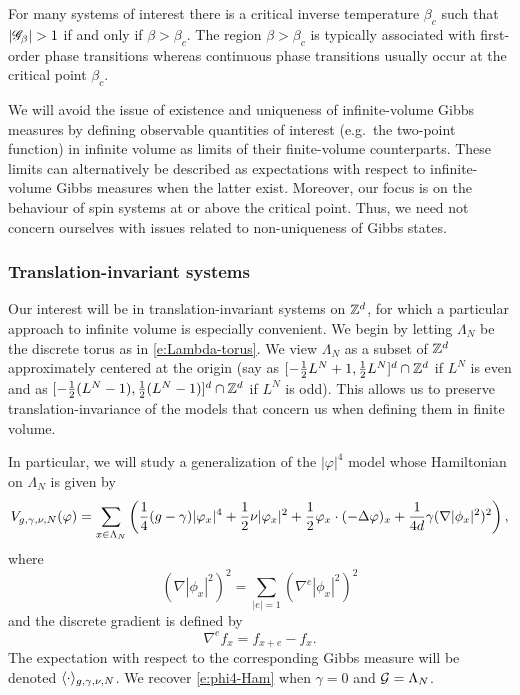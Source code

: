 For many systems of interest there is a critical inverse temperature $\beta_c$ such that
$|\mathscr{G}_\beta| > 1$ if and only if $\beta > \beta_c$. The region $\beta > \beta_c$ is typically
associated with first-order phase transitions whereas continuous phase transitions usually occur
at the critical point $\beta_c$.

We will avoid the issue of existence and uniqueness of infinite-volume Gibbs
measures
by defining observable quantities of interest (e.g.\ the two-point function) in infinite
volume as limits of their finite-volume counterparts. These limits can alternatively be
described as expectations with respect to infinite-volume Gibbs measures when the latter
exist. Moreover, our focus is on the behaviour of spin systems at or above the critical
point. Thus, we need not concern ourselves with issues related to non-uniqueness of Gibbs
states.

\subsubsection{Translation-invariant systems}

Our interest will be in translation-invariant systems on ${ {{\mathbb Z}}^d }$, for which a particular
approach to infinite volume is especially convenient. We begin by letting $\Lambda_N$
be the discrete torus as in \eqref{e:Lambda-torus}. We view $\Lambda_N$
as a subset of ${ {{\mathbb Z}}^d }$ approximately centered at the origin (say as
$[-\frac12 L^N+1,\frac12 L^N]^d \cap {\mathbb Z}^d$ if $L^N$ is even
and as $[-\frac12 (L^N-1), \frac12 (L^N-1)]^d \cap {\mathbb Z}^d$ if $L^N$ is odd). This allows us to preserve
translation-invariance of the models that concern us when defining them in finite volume.

In particular, we will study a generalization of the $|\varphi|^4$ model whose Hamiltonian
on $\Lambda_N$ is given by
\begin{equation}
\label{e:Vdef1}
V_{g,\gamma,\nu,N}(\varphi)
	=
\sum_{x\in\Lambda_N}
\left(
	\frac{1}{4} (g - \gamma) |\varphi_x|^4
		+
	\frac{1}{2} \nu |\varphi_x|^2
		+
	\frac{1}{2} \varphi_x \cdot (-\Delta \varphi)_x
		+
	\frac{1}{4 d} \gamma (\nabla |\phi_x|^2)^2
\right),
\end{equation}
where
\begin{equation}
(\nabla |\phi_x|^2)^2
	=
\sum_{|e|=1} (\nabla^e |\phi_x|^2)^2
\end{equation}
and the discrete gradient is defined by
\begin{equation}
\nabla^e f_x = f_{x+e} - f_x.
\end{equation}
The expectation with respect to the corresponding Gibbs measure will
be denoted $\langle\cdot\rangle_{g,\gamma,\nu,N}$.
We recover \eqref{e:phi4-Ham} when $\gamma = 0$ and $\mathcal{G} = \Lambda_N$.

